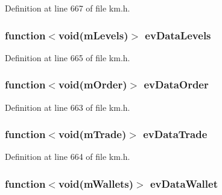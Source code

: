Definition at line 667 of file km.\+h.

\subsubsection[{\texorpdfstring{ev\+Data\+Levels}{evDataLevels}}]{\setlength{\rightskip}{0pt plus 5cm}function$<$void({\bf m\+Levels})$>$ ev\+Data\+Levels}\hypertarget{class_k_1_1_gw_a2d20ec3398210965d042521449f1d890}{}\label{class_k_1_1_gw_a2d20ec3398210965d042521449f1d890}


Definition at line 665 of file km.\+h.

\subsubsection[{\texorpdfstring{ev\+Data\+Order}{evDataOrder}}]{\setlength{\rightskip}{0pt plus 5cm}function$<$void({\bf m\+Order})$>$ ev\+Data\+Order}\hypertarget{class_k_1_1_gw_adf1e832cf66132207c5b97edb28437bf}{}\label{class_k_1_1_gw_adf1e832cf66132207c5b97edb28437bf}


Definition at line 663 of file km.\+h.

\subsubsection[{\texorpdfstring{ev\+Data\+Trade}{evDataTrade}}]{\setlength{\rightskip}{0pt plus 5cm}function$<$void({\bf m\+Trade})$>$ ev\+Data\+Trade}\hypertarget{class_k_1_1_gw_a6cdc51ebb4004f0a69afafb623d9d7e0}{}\label{class_k_1_1_gw_a6cdc51ebb4004f0a69afafb623d9d7e0}


Definition at line 664 of file km.\+h.

\subsubsection[{\texorpdfstring{ev\+Data\+Wallet}{evDataWallet}}]{\setlength{\rightskip}{0pt plus 5cm}function$<$void({\bf m\+Wallets})$>$ ev\+Data\+Wallet}\hypertarget{class_k_1_1_gw_ae539d2c47a0e797655fea7dcc8666408}{}\label{class_k_1_1_gw_ae539d2c47a0e797655fea7dcc8666408}


